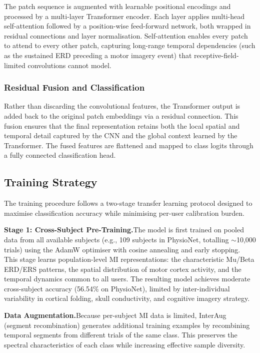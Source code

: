 \documentclass[12pt, a4paper]{article}
\begin{document}
The patch sequence is augmented with learnable positional encodings and processed by a multi-layer Transformer encoder. Each layer applies multi-head self-attention followed by a position-wise feed-forward network, both wrapped in residual connections and layer normalisation. Self-attention enables every patch to attend to every other patch, capturing long-range temporal dependencies (such as the sustained ERD preceding a motor imagery event) that receptive-field-limited convolutions cannot model.

\subsubsection{Residual Fusion and Classification}

Rather than discarding the convolutional features, the Transformer output is added back to the original patch embeddings via a residual connection. This fusion ensures that the final representation retains both the local spatial and temporal detail captured by the CNN and the global context learned by the Transformer. The fused features are flattened and mapped to class logits through a fully connected classification head.

\subsection{Training Strategy}

The training procedure follows a two-stage transfer learning protocol designed to maximise classification accuracy while minimising per-user calibration burden.

\textbf{Stage 1: Cross-Subject Pre-Training.}\quad The model is first trained on pooled data from all available subjects (e.g., 109 subjects in PhysioNet, totalling $\sim$10,000 trials) using the AdamW optimiser with cosine annealing and early stopping. This stage learns population-level MI representations: the characteristic Mu/Beta ERD/ERS patterns, the spatial distribution of motor cortex activity, and the temporal dynamics common to all users. The resulting model achieves moderate cross-subject accuracy (56.54\% on PhysioNet), limited by inter-individual variability in cortical folding, skull conductivity, and cognitive imagery strategy.

\textbf{Data Augmentation.}\quad Because per-subject MI data is limited, InterAug (segment recombination) generates additional training examples by recombining temporal segments from different trials of the same class. This preserves the spectral characteristics of each class while increasing effective sample diversity.
\end{document}
